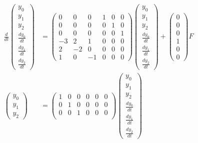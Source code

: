 \documentclass[a4paper,11pt,fleqn]{jreport}
\begin{document}
\begin{align}
 \frac{d}{dt} \left(\begin{array}{c}
	         y_0 \\
		     y_1 \\
		     y_2 \\
		     \frac{dy_0}{dt} \\
		     \frac{dy_1}{dt} \\
		     \frac{dy_2}{dt}
		    \end{array}\right)
 &=
 \left(\begin{array}{rrrrrr}
        0 & 0 & 0 & 1 & 0 & 0      \\
        0 & 0 & 0 & 0 & 1 & 0      \\
        0 & 0 & 0 & 0 & 0 & 1      \\
	-3& 2 & 1 & 0 & 0 & 0 \\
	2 & -2& 0 & 0 & 0 & 0 \\
	1 & 0 & -1& 0 & 0 & 0 
       \end{array}\right)
 \left(\begin{array}{c}
	         y_0 \\
		     y_1 \\
		     y_2 \\
		     \frac{dy_0}{dt} \\
		     \frac{dy_1}{dt} \\
		     \frac{dy_2}{dt}
       \end{array}\right)
 +
 \left(\begin{array}{c}
        0 \\
        0 \\
        0 \\
	    1 \\
	    0 \\
	    0 
       \end{array}\right)
        F
\nonumber
\\
 \left(\begin{array}{c}
	    y_0 \\
		y_1 \\
		y_2
       \end{array}\right)
 &=
 \left(\begin{array}{rrrrrr}
         1 & 0 & 0 & 0 & 0 & 0  \\
         0 & 1 & 0 & 0 & 0 & 0 \\
         0 & 0 & 1 & 0 & 0 & 0 \\
       \end{array}\right)
 \left(\begin{array}{c}
	         y_0 \\
		     y_1 \\
		     y_2 \\
		     \frac{dy_0}{dt} \\
		     \frac{dy_1}{dt} \\
		     \frac{dy_2}{dt}
       \end{array}\right)
\nonumber
\end{align}
\end{document}
